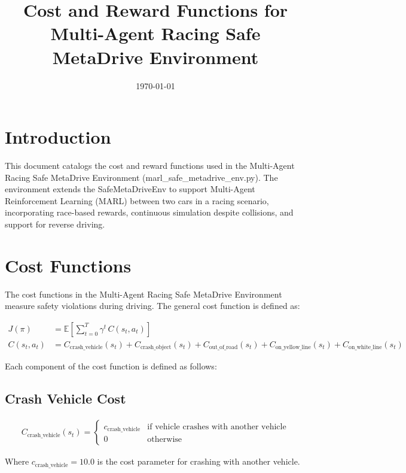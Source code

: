 \documentclass{article}
\title{Cost and Reward Functions for Multi-Agent Racing Safe MetaDrive Environment}
\author{}
\date{\today}
\begin{document}
\maketitle

\section{Introduction}

This document catalogs the cost and reward functions used in the Multi-Agent Racing Safe MetaDrive Environment (marl\_safe\_metadrive\_env.py). The environment extends the SafeMetaDriveEnv to support Multi-Agent Reinforcement Learning (MARL) between two cars in a racing scenario, incorporating race-based rewards, continuous simulation despite collisions, and support for reverse driving.

\section{Cost Functions}

The cost functions in the Multi-Agent Racing Safe MetaDrive Environment measure safety violations during driving. The general cost function is defined as:

\begin{align}
J(\pi) &= \mathbb{E}\left[\sum_{t=0}^T \gamma^t\,C(s_t,a_t)\right] \\
C(s_t,a_t) &= C_{\text{crash\_vehicle}}(s_t) + C_{\text{crash\_object}}(s_t) + C_{\text{out\_of\_road}}(s_t) + C_{\text{on\_yellow\_line}}(s_t) + C_{\text{on\_white\_line}}(s_t)
\end{align}

Each component of the cost function is defined as follows:

\subsection{Crash Vehicle Cost}

\begin{align}
C_{\text{crash\_vehicle}}(s_t) = 
\begin{cases}
c_{\text{crash\_vehicle}} & \text{if vehicle crashes with another vehicle} \\
0 & \text{otherwise}
\end{cases}
\end{align}

Where $c_{\text{crash\_vehicle}} = 10.0$ is the cost parameter for crashing with another vehicle.
\end{document}
